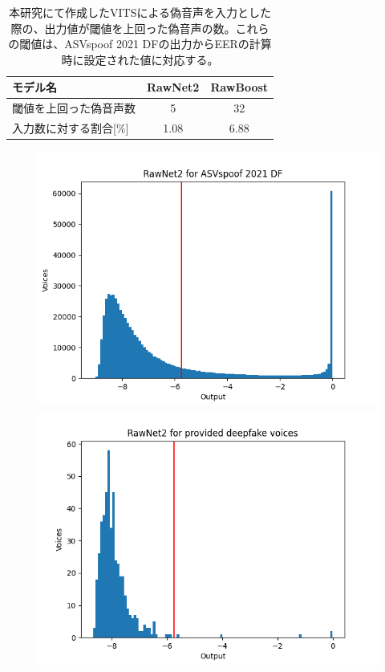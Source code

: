 \begin{table}[h]
    \centering
    \begin{tabular}{lcc}\hline
        モデル名 & RawNet2 & RawBoost \\ \hline \hline
        閾値を上回った偽音声数 & 5 & 32 \\
        入力数に対する割合[\%] & 1.08 & 6.88 \\ \hline
    \end{tabular}
    \caption{本研究にて作成したVITSによる偽音声を入力とした際の、出力値が閾値を上回った偽音声の数。これらの閾値は、ASVspoof 2021 DFの出力からEERの計算時に設定された値に対応する。}
    \label{tab:greater}
\end{table}

\begin{figure}
    \centering
    \begin{minipage}[b]{0.45\hsize}
        \centering
        \includegraphics[width=\linewidth]{figures/rawnet2_asv.png} 
        \subcaption{}
    \end{minipage}
    \begin{minipage}[b]{0.45\hsize}
        \centering
        \includegraphics[width=\linewidth]{figures/rawnet2_prop.png}

\end{minipage}
\end{figure}
